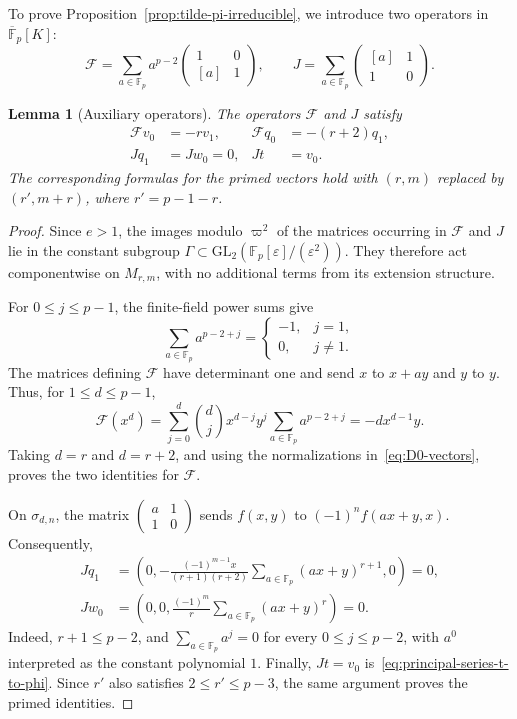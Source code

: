 \documentclass[10pt]{article}
\theoremstyle{plain}
\newtheorem{lemma}[theorem]{Lemma}
\theoremstyle{definition}
\theoremstyle{remark}
\newcommand{\Fp}{\mathbb{F}_p}
\newcommand{\Fpbar}{\overline{\mathbb{F}}_p}
\newcommand{\GL}{\mathrm{GL}}
\begin{document}
To prove Proposition~\ref{prop:tilde-pi-irreducible}, we introduce two operators in $\Fpbar[K]$:
\begin{equation}\label{eq:F-J-definition}
\mathcal F=\sum_{a\in\Fp}a^{p-2}
\begin{pmatrix}1&0\\{[a]}&1\end{pmatrix},
\qquad
J=\sum_{a\in\Fp}\begin{pmatrix}[a]&1\\1&0\end{pmatrix}.
\end{equation}
\begin{lemma}[Auxiliary operators]\label{lem:auxiliary-operators}
The operators $\mathcal F$ and $J$ satisfy
\begin{equation}\label{eq:F-J-basis-actions}
\begin{aligned}
\mathcal F v_0&=-r v_1, & \mathcal F q_0&=-(r+2)q_1,\\
Jq_1&=Jw_0=0, & Jt&=v_0.
\end{aligned}
\end{equation}
The corresponding formulas for the primed vectors hold with $(r,m)$ replaced by $(r',m+r)$, where $r'=p-1-r$.
\end{lemma}

\begin{proof}
Since $e>1$, the images modulo $\varpi^2$ of the matrices occurring in $\mathcal F$ and $J$ lie in the constant subgroup $\Gamma\subset\GL_2(\Fp[\varepsilon]/(\varepsilon^2))$. They therefore act componentwise on $M_{r,m}$, with no additional terms from its extension structure.

For $0\leq j\leq p-1$, the finite-field power sums give
\[
\sum_{a\in\Fp}a^{p-2+j}=
\begin{cases}-1,&j=1,\\0,&j\ne1.\end{cases}
\]
The matrices defining $\mathcal F$ have determinant one and send $x$ to $x+ay$ and $y$ to $y$. Thus, for $1\leq d\leq p-1$,
\[
\mathcal F(x^d)=\sum_{j=0}^d\binom dj x^{d-j}y^j
\sum_{a\in\Fp}a^{p-2+j}=-d x^{d-1}y.
\]
Taking $d=r$ and $d=r+2$, and using the normalizations in~\eqref{eq:D0-vectors}, proves the two identities for $\mathcal F$.

On $\sigma_{d,n}$, the matrix $\begin{pmatrix}a&1\\1&0\end{pmatrix}$ sends $f(x,y)$ to $(-1)^n f(ax+y,x)$. Consequently,
\begin{align*}
Jq_1&=\left(0,-\frac{(-1)^{m-1}x}{(r+1)(r+2)}
\sum_{a\in\Fp}(ax+y)^{r+1},0\right)=0,\\
Jw_0&=\left(0,0,\frac{(-1)^m}{r}
\sum_{a\in\Fp}(ax+y)^r\right)=0.
\end{align*}
Indeed, $r+1\leq p-2$, and $\sum_{a\in\Fp}a^j=0$ for every $0\leq j\leq p-2$, with $a^0$ interpreted as the constant polynomial $1$. Finally, $Jt=v_0$ is~\eqref{eq:principal-series-t-to-phi}. Since $r'$ also satisfies $2\leq r'\leq p-3$, the same argument proves the primed identities.
\end{proof}
\end{document}
